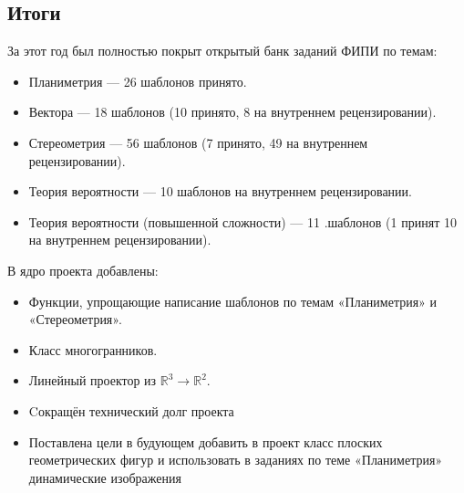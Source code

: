 \documentclass[a4paper, 12pt]{extarticle}
\begin{document}
\subsection*{Итоги}
За этот год был полностью покрыт открытый банк заданий ФИПИ по темам:
\begin{itemize}
	\item Планиметрия — 26 шаблонов принято.
	\item Вектора — 18 шаблонов (10 принято, 8 на внутреннем рецензировании).
	\item Стереометрия — 56 шаблонов (7 принято, 49 на внутреннем рецензировании).
	\item Теория вероятности — 10 шаблонов на внутреннем рецензировании.
	\item Теория вероятности (повышенной сложности) — 11 .шаблонов (1 принят 10 на внутреннем рецензировании).
\end{itemize}

В ядро проекта добавлены:
\begin{itemize}
	\item Функции, упрощающие написание шаблонов по темам «Планиметрия» и  «Стереометрия».
	\item Класс многогранников.
	\item Линейный проектор из $\mathbb{R}^3 \to \mathbb{R}^2$.
	\item Cокращён технический долг проекта
	\item Поставлена цели в будующем добавить в проект класс плоских геометрических фигур и использовать в заданиях по теме «Планиметрия» динамические изображения
\end{itemize}
\end{document}
